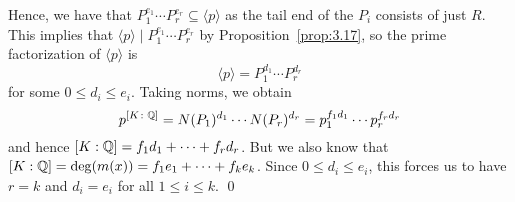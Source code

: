 \begin{pf}
    Hence, we have that $P_1^{e_1} \cdots P_r^{e_r} \subseteq \langle p \rangle$ 
    as the tail end of the $P_i$ consists of just $R$. This implies that 
    $\langle p \rangle \mid P_1^{e_1} \cdots P_r^{e_r}$ by Proposition~\ref{prop:3.17},
    so the prime factorization of $\langle p \rangle$ is 
    \[ \langle p \rangle = P_1^{d_1} \cdots P_r^{d_r} \] 
    for some $0 \leq d_i \leq e_i$. Taking norms, we obtain 
    \[ p^{[K\colon\mathbb{Q}]} = N(P_1)^{d_1} \cdots N(P_r)^{d_r} = p_1^{f_1d_1} \cdots p_r^{f_rd_r} \]  
    and hence $[K : \mathbb{Q}] = f_1d_1 + \cdots + f_rd_r$. But we also know that $[K : \mathbb{Q}] 
    = \deg(m(x)) = f_1e_1 + \cdots + f_ke_k$. Since $0 \leq d_i \leq e_i$, this forces us 
    to have $r = k$ and $d_i = e_i$ for all $1 \leq i \leq k$. \qed 
\end{pf}